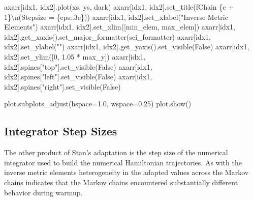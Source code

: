 \documentclass[
  letterpaper,
  DIV=11,
  numbers=noendperiod]{scrartcl}
\newenvironment{Shaded}{\begin{snugshade}}{\end{snugshade}}
\newcommand{\CharTok}[1]{\textcolor[rgb]{0.13,0.47,0.30}{#1}}
\newcommand{\DecValTok}[1]{\textcolor[rgb]{0.68,0.00,0.00}{#1}}
\newcommand{\FloatTok}[1]{\textcolor[rgb]{0.68,0.00,0.00}{#1}}
\newcommand{\NormalTok}[1]{\textcolor[rgb]{0.00,0.23,0.31}{#1}}
\newcommand{\OperatorTok}[1]{\textcolor[rgb]{0.37,0.37,0.37}{#1}}
\newcommand{\SpecialCharTok}[1]{\textcolor[rgb]{0.37,0.37,0.37}{#1}}
\newcommand{\SpecialStringTok}[1]{\textcolor[rgb]{0.13,0.47,0.30}{#1}}
\newcommand{\StringTok}[1]{\textcolor[rgb]{0.13,0.47,0.30}{#1}}
\newcommand{\VariableTok}[1]{\textcolor[rgb]{0.07,0.07,0.07}{#1}}
\begin{document}
\begin{Shaded}
\begin{Highlighting}[]
\NormalTok{    axarr[idx1, idx2].plot(xs, ys, dark)}
\NormalTok{    axarr[idx1, idx2].set\_title(}\SpecialStringTok{f\textquotesingle{}Chain }\SpecialCharTok{\{}\NormalTok{c }\OperatorTok{+} \DecValTok{1}\SpecialCharTok{\}}\CharTok{\textbackslash{}n}\SpecialStringTok{(Stepsize = }\SpecialCharTok{\{}\NormalTok{eps}\SpecialCharTok{:.3e\}}\SpecialStringTok{)\textquotesingle{}}\NormalTok{)}
\NormalTok{    axarr[idx1, idx2].set\_xlabel(}\StringTok{"Inverse Metric Elements"}\NormalTok{)}
\NormalTok{    axarr[idx1, idx2].set\_xlim([min\_elem, max\_elem])}
\NormalTok{    axarr[idx1, idx2].get\_xaxis().set\_major\_formatter(sci\_formatter)}
\NormalTok{    axarr[idx1, idx2].set\_ylabel(}\StringTok{""}\NormalTok{)}
\NormalTok{    axarr[idx1, idx2].get\_yaxis().set\_visible(}\VariableTok{False}\NormalTok{)}
\NormalTok{    axarr[idx1, idx2].set\_ylim([}\DecValTok{0}\NormalTok{, }\FloatTok{1.05} \OperatorTok{*}\NormalTok{ max\_y])}
\NormalTok{    axarr[idx1, idx2].spines[}\StringTok{"top"}\NormalTok{].set\_visible(}\VariableTok{False}\NormalTok{)}
\NormalTok{    axarr[idx1, idx2].spines[}\StringTok{"left"}\NormalTok{].set\_visible(}\VariableTok{False}\NormalTok{)}
\NormalTok{    axarr[idx1, idx2].spines[}\StringTok{"right"}\NormalTok{].set\_visible(}\VariableTok{False}\NormalTok{)}
  
\NormalTok{  plot.subplots\_adjust(hspace}\OperatorTok{=}\FloatTok{1.0}\NormalTok{, wspace}\OperatorTok{=}\FloatTok{0.25}\NormalTok{)}
\NormalTok{  plot.show()}
\end{Highlighting}
\end{Shaded}

\hypertarget{integrator-step-sizes}{%
\subsection{Integrator Step Sizes}\label{integrator-step-sizes}}

The other product of Stan's adaptation is the step size of the numerical
integrator used to build the numerical Hamiltonian trajectories. As with
the inverse metric elements heterogeneity in the adapted values across
the Markov chains indicates that the Markov chains encountered
substantially different behavior during warmup.
\end{document}
